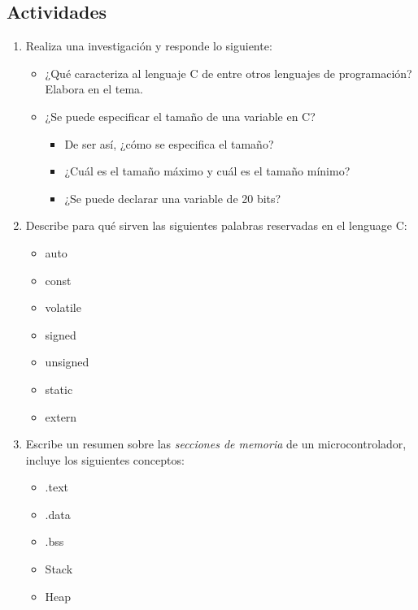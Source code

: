 \documentclass[11pt,letterpaper]{article}
\begin{document}
\subsection*{Actividades}
\begin{enumerate}[label=\arabic*)]
    \item Realiza una investigación y responde lo siguiente:
    \begin{itemize}
        \item ¿Qué caracteriza al lenguaje C de entre otros lenguajes de programación? Elabora en el tema.
        \item ¿Se puede especificar el tamaño de una variable en C? 
        \begin{itemize}
            \item De ser así, ¿cómo se especifica el tamaño?
            \item ¿Cuál es el tamaño máximo y cuál es el tamaño mínimo? 
            \item ¿Se puede declarar una variable de 20 bits?
        \end{itemize}
    \end{itemize}
    \item Describe para qué sirven las siguientes palabras reservadas en el lenguage C:
    \begin{itemize}
        \item auto 
        \item const
        \item volatile
        \item signed 
        \item unsigned
        \item static
        \item extern
    \end{itemize}
    \item Escribe un resumen sobre las \textit{secciones de memoria} de un microcontrolador, incluye los siguientes conceptos:
    \begin{itemize}
        \item .text 
        \item .data
        \item .bss 
        \item Stack 
        \item Heap
    \end{itemize}
\end{enumerate}
\end{document}
